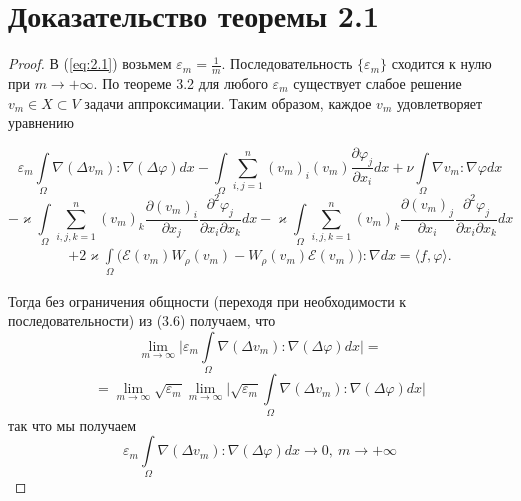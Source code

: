 \section{Доказательство теоремы 2.1}

\begin{proof}
    В (\ref{eq:2.1}) возьмем $\varepsilon_m = \frac{1}{m}$. Последовательность $\{\varepsilon_m\}$ сходится к нулю при $m \rightarrow +\infty$.
    По теореме 3.2 для любого $\varepsilon_m$ существует слабое решение $v_m \in X \subset V$ задачи аппроксимации.
    Таким образом, каждое $v_m$ удовлетворяет уравнению

    $$\varepsilon_m \int\limits_{\Omega} \nabla (\Delta v_m): \nabla (\Delta \varphi) dx -
    \int\limits_{\Omega}\sum_{i,j=1}^n (v_m)_i (v_m) \frac{\partial \varphi_j}{\partial x_i} dx + \nu
    \int\limits_{\Omega} \nabla v_m: \nabla \varphi dx$$
    $$-\varkappa \int\limits_{\Omega}\sum_{i,j,k=1}^n (v_m)_k
    \frac{\partial (v_m)_i}{\partial x_j} \frac{\partial^2 \varphi_j}{\partial x_i \partial x_k} dx - \varkappa \int\limits_{\Omega}\sum_{i,j,k=1}^n
    (v_m)_k \frac{\partial (v_m)_j}{\partial x_i} \frac{\partial^2 \varphi_j}{\partial x_i \partial x_k} dx$$
    \begin{equation}\label{eq:4.1}
        \begin{gathered}
            +2\varkappa \int\limits_{\Omega} \bigg(\mathcal{E}(v_m)W_\rho (v_m) - W_\rho(v_m)\mathcal{E}(v_m)\bigg): \nabla dx =
            \langle f, \varphi \rangle.
        \end{gathered}
    \end{equation}

    Тогда без ограничения общности (переходя при необходимости к последовательности) из (3.6) получаем, что
    $$\lim_{m \rightarrow \infty}\bigg| \varepsilon_m \int\limits_{\Omega} \nabla (\Delta v_m): \nabla (\Delta \varphi) dx \bigg| =$$
    $$=\lim_{m \rightarrow \infty} \sqrt{\varepsilon_m} \lim_{m \rightarrow \infty}\bigg|\sqrt{\varepsilon_m}
    \int\limits_{\Omega} \nabla (\Delta v_m): \nabla (\Delta \varphi) dx \bigg|$$
    так что мы получаем
    $$\varepsilon_m \int\limits_{\Omega} \nabla (\Delta v_m): \nabla (\Delta \varphi) dx \rightarrow 0, \ m \rightarrow +\infty$$


\end{proof}
